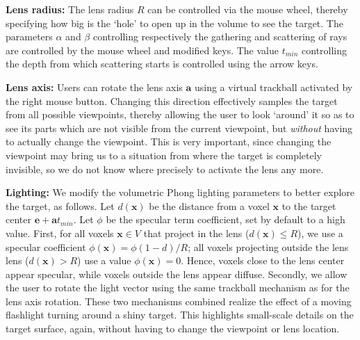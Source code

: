 \vspace{0.2cm}
\noindent\textbf{Lens radius:} The lens radius $R$ can be controlled via the mouse wheel, thereby specifying how big is the `hole' to open up in the volume to see the target. The parameters $\alpha$ and $\beta$ controlling respectively the gathering and scattering of rays are controlled by the mouse wheel and modified keys. The value $t_{min}$ controlling the depth from which scattering starts is controlled using the arrow keys.

\vspace{0.2cm}
\noindent\textbf{Lens axis:} Users can rotate the lens axis $\mathbf{a}$ using a virtual trackball activated by the right mouse button. Changing this direction effectively samples the target from all possible viewpoints, thereby allowing the user to look `around' it so as to see its parts which are not visible from the current viewpoint, but \emph{without} having to actually change the viewpoint. This is very important, since changing the viewpoint may bring us to a situation from where the target is completely invisible, so we do not know where precisely to activate the lens any more.

\vspace{0.2cm}
\noindent\textbf{Lighting:} We modify the volumetric Phong lighting parameters to better explore the target, as follows. Let $d(\mathbf{x})$ be the distance from a voxel $\mathbf{x}$ to the target center $\mathbf{e} + \mathbf{a}t_{min}$. Let $\phi$ be the specular term coefficient, set by default to a high value. First, for all voxels $\mathbf{x} \in V$ that project in the lens ($d(\mathbf{x}) \leq R$), we use a specular coefficient $\phi(\mathbf{x}) = \phi (1-d)/R$; all voxels projecting outside the lens lens ($d(\mathbf{x}) > R$) use a value $\phi(\mathbf{x}) = 0$. Hence, voxels close to the lens center appear specular, while voxels outside the lens appear diffuse. Secondly, we allow the user to rotate the light vector using the same trackball mechanism as for the lens axis rotation. These two mechanisms combined realize the effect of a moving flashlight turning around a shiny target. This highlights small-scale details on the target surface, again, without having to change the viewpoint or lens location.

